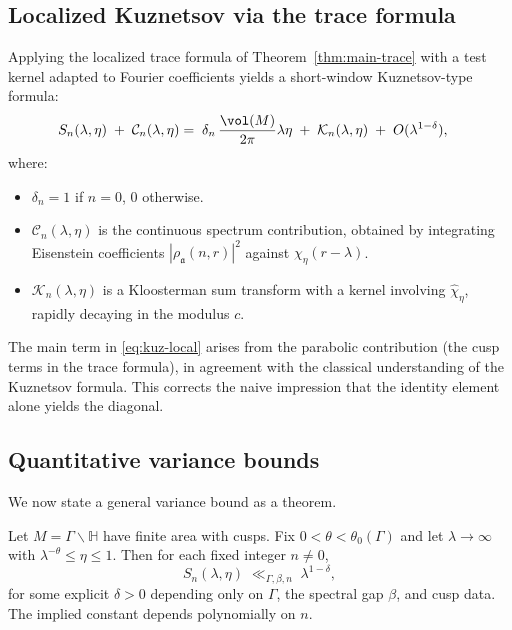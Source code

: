 \subsection{Localized Kuznetsov via the trace formula}
Applying the localized trace formula of Theorem~\ref{thm:main-trace} with a test kernel adapted to Fourier coefficients yields a short-window Kuznetsov-type formula:
\begin{align}\label{eq:kuz-local}
S_n(\lambda,\eta)\;+\;\mathcal{C}_n(\lambda,\eta)
&=\;\delta_{n}\,\frac{\vol(M)}{2\pi}\lambda\eta \;+\; \mathcal{K}_n(\lambda,\eta)\;+\;O(\lambda^{1-\delta}),
\end{align}
where:
\begin{itemize}
\item $\delta_n=1$ if $n=0$, $0$ otherwise.
\item $\mathcal{C}_n(\lambda,\eta)$ is the continuous spectrum contribution, obtained by integrating Eisenstein coefficients $|\rho_{\mathfrak{a}}(n,r)|^2$ against $\chi_\eta(r-\lambda)$.
\item $\mathcal{K}_n(\lambda,\eta)$ is a Kloosterman sum transform with a kernel involving $\widehat{\chi}_\eta$, rapidly decaying in the modulus $c$.
\end{itemize}
The main term in \eqref{eq:kuz-local} arises from the parabolic contribution (the cusp terms in the trace formula), in agreement with the classical understanding of the Kuznetsov formula. This corrects the naive impression that the identity element alone yields the diagonal.

\subsection{Quantitative variance bounds}
We now state a general variance bound as a theorem.

\begin{theorem}\label{thm:variance}
Let $M=\Gamma\backslash\mathbb{H}$ have finite area with cusps. Fix $0<\theta<\theta_0(\Gamma)$ and let $\lambda\to\infty$ with $\lambda^{-\theta}\le \eta\le 1$. Then for each fixed integer $n\neq 0$,
\begin{equation}\label{eq:variance-bound}
S_n(\lambda,\eta)
\;\ll_{\Gamma,\beta,n}\; \lambda^{1-\delta},
\end{equation}
for some explicit $\delta>0$ depending only on $\Gamma$, the spectral gap $\beta$, and cusp data. The implied constant depends polynomially on $n$.
\end{theorem}

